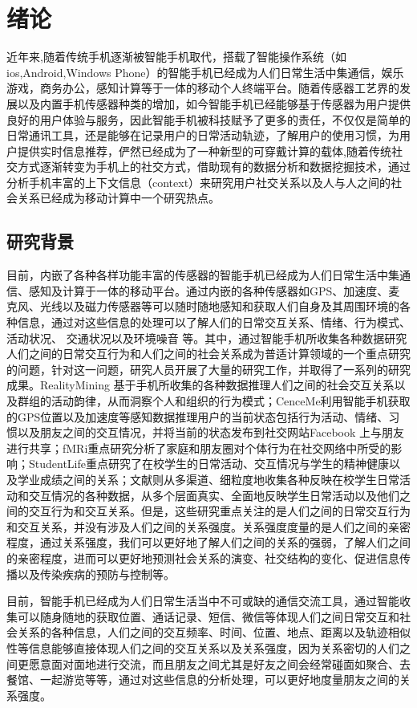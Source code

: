\chapter{绪论}
近年来,随着传统手机逐渐被智能手机取代，搭载了智能操作系统（如ios,Android,Windows Phone）的智能手机已经成为人们日常生活中集通信，娱乐游戏，商务办公，感知计算等于一体的移动个人终端平台。随着传感器工艺界的发展以及内置手机传感器种类的增加，如今智能手机已经能够基于传感器为用户提供良好的用户体验与服务，因此智能手机被科技赋予了更多的责任，不仅仅是简单的日常通讯工具，还是能够在记录用户的日常活动轨迹，了解用户的使用习惯，为用户提供实时信息推荐，俨然已经成为了一种新型的可穿戴计算的载体,随着传统社交方式逐渐转变为手机上的社交方式，借助现有的数据分析和数据挖掘技术，通过分析手机丰富的上下文信息（context）来研究用户社交关系以及人与人之间的社会关系已经成为移动计算中一个研究热点。

\section{研究背景}
目前，内嵌了各种各样功能丰富的传感器的智能手机已经成为人们日常生活中集通信、感知及计算于一体的移动平台。通过内嵌的各种传感器如GPS、加速度、麦克风、光线以及磁力传感器等可以随时随地感知和获取人们自身及其周围环境的各种信息，通过对这些信息的处理可以了解人们的日常交互关系、情绪、行为模式、活动状况、 交通状况以及环境噪音 等。其中，通过智能手机所收集各种数据研究人们之间的日常交互行为和人们之间的社会关系成为普适计算领域的一个重点研究的问题，针对这一问题，研究人员开展了大量的研究工作，并取得了一系列的研究成果。RealityMining 基于手机所收集的各种数据推理人们之间的社会交互关系以及群组的活动韵律，从而洞察个人和组织的行为模式；CenceMe利用智能手机获取的GPS位置以及加速度等感知数据推理用户的当前状态包括行为活动、情绪、习惯以及朋友之间的交互情况，并将当前的状态发布到社交网站Facebook 上与朋友进行共享；fMRi重点研究分析了家庭和朋友圈对个体行为在社交网络中所受的影响；StudentLife重点研究了在校学生的日常活动、交互情况与学生的精神健康以及学业成绩之间的关系；文献\cite{stopczynski2014measuring}则从多渠道、细粒度地收集各种反映在校学生日常活动和交互情况的各种数据，从多个层面真实、全面地反映学生日常活动以及他们之间的交互行为和交互关系。但是，这些研究重点关注的是人们之间的日常交互行为和交互关系，并没有涉及人们之间的关系强度。关系强度度量的是人们之间的亲密程度，通过关系强度，我们可以更好地了解人们之间的关系的强弱，了解人们之间的亲密程度，进而可以更好地预测社会关系的演变、社交结构的变化、促进信息传播以及传染疾病的预防与控制等。
\par 目前，智能手机已经成为人们日常生活当中不可或缺的通信交流工具，通过智能收集可以随身随地的获取位置、通话记录、短信、微信等体现人们之间日常交互和社会关系的各种信息，人们之间的交互频率、时间、位置、地点、距离以及轨迹相似性等信息能够直接体现人们之间的交互关系以及关系强度，因为关系密切的人们之间更愿意面对面地进行交流，而且朋友之间尤其是好友之间会经常碰面如聚合、去餐馆、一起游览等等，通过对这些信息的分析处理，可以更好地度量朋友之间的关系强度。

